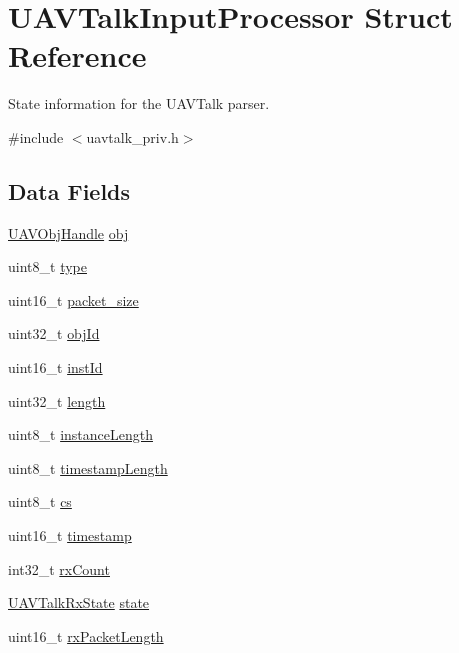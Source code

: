 \hypertarget{struct_u_a_v_talk_input_processor}{\section{\-U\-A\-V\-Talk\-Input\-Processor \-Struct \-Reference}
\label{struct_u_a_v_talk_input_processor}
}


\-State information for the \-U\-A\-V\-Talk parser.  




{\ttfamily \#include $<$uavtalk\-\_\-priv.\-h$>$}

\subsection*{\-Data \-Fields}
\begin{DoxyCompactItemize}
\item 
\hyperlink{targets_2_u_a_v_objects_2inc_2uavobjectmanager_8h_a279053e22be53ce9f895043aaeb91e3b}{\-U\-A\-V\-Obj\-Handle} \hyperlink{struct_u_a_v_talk_input_processor_a78153a61f3d6bd1097e51b65f176c341}{obj}
\item 
uint8\-\_\-t \hyperlink{struct_u_a_v_talk_input_processor_a65de259b3813b2be47d056480622bcbc}{type}
\item 
uint16\-\_\-t \hyperlink{struct_u_a_v_talk_input_processor_a21adf6a8fc9bfc307b883a7b8ff412d1}{packet\-\_\-size}
\item 
uint32\-\_\-t \hyperlink{struct_u_a_v_talk_input_processor_a02e62fc516bd524be74fd36898116d52}{obj\-Id}
\item 
uint16\-\_\-t \hyperlink{struct_u_a_v_talk_input_processor_a5cd40d45450a1bd25688d47bec6c237a}{inst\-Id}
\item 
uint32\-\_\-t \hyperlink{struct_u_a_v_talk_input_processor_aed838e1ff0464bc7a7a2c83d699cbb26}{length}
\item 
uint8\-\_\-t \hyperlink{struct_u_a_v_talk_input_processor_ab2cadd287203a554072316545674d14c}{instance\-Length}
\item 
uint8\-\_\-t \hyperlink{struct_u_a_v_talk_input_processor_ae5fadf5b763839a191f044b2a2492366}{timestamp\-Length}
\item 
uint8\-\_\-t \hyperlink{struct_u_a_v_talk_input_processor_a7e4bd3c94cfc37e346d4ce38445ca742}{cs}
\item 
uint16\-\_\-t \hyperlink{struct_u_a_v_talk_input_processor_a184962821e9c4b260b39f7bf1c576150}{timestamp}
\item 
int32\-\_\-t \hyperlink{struct_u_a_v_talk_input_processor_a478ba62595ad5977cbc9c0897e11ee10}{rx\-Count}
\item 
\hyperlink{group___u_a_v_talk_ga8a49dc52ac01b5d0782811f284df691c}{\-U\-A\-V\-Talk\-Rx\-State} \hyperlink{struct_u_a_v_talk_input_processor_ae2d58b353cb569cf8fcb956f1b0b3413}{state}
\item 
uint16\-\_\-t \hyperlink{struct_u_a_v_talk_input_processor_a39d9853a0ea6695927ffe0930225cfbe}{rx\-Packet\-Length}
\end{DoxyCompactItemize}


